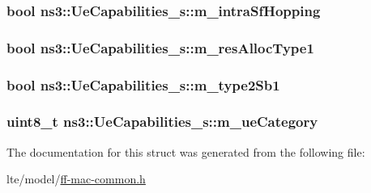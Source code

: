 \subsubsection[{\texorpdfstring{m\+\_\+intra\+Sf\+Hopping}{m_intraSfHopping}}]{\setlength{\rightskip}{0pt plus 5cm}bool ns3\+::\+Ue\+Capabilities\+\_\+s\+::m\+\_\+intra\+Sf\+Hopping}\hypertarget{structns3_1_1UeCapabilities__s_a1472edbb4f5fbbb415dedf557f324617}{}\label{structns3_1_1UeCapabilities__s_a1472edbb4f5fbbb415dedf557f324617}
\subsubsection[{\texorpdfstring{m\+\_\+res\+Alloc\+Type1}{m_resAllocType1}}]{\setlength{\rightskip}{0pt plus 5cm}bool ns3\+::\+Ue\+Capabilities\+\_\+s\+::m\+\_\+res\+Alloc\+Type1}\hypertarget{structns3_1_1UeCapabilities__s_a8e2976f85b05f3dd1959c99e2a173614}{}\label{structns3_1_1UeCapabilities__s_a8e2976f85b05f3dd1959c99e2a173614}
\subsubsection[{\texorpdfstring{m\+\_\+type2\+Sb1}{m_type2Sb1}}]{\setlength{\rightskip}{0pt plus 5cm}bool ns3\+::\+Ue\+Capabilities\+\_\+s\+::m\+\_\+type2\+Sb1}\hypertarget{structns3_1_1UeCapabilities__s_a01d57ac1baec239924ffe55ed94b1f06}{}\label{structns3_1_1UeCapabilities__s_a01d57ac1baec239924ffe55ed94b1f06}
\subsubsection[{\texorpdfstring{m\+\_\+ue\+Category}{m_ueCategory}}]{\setlength{\rightskip}{0pt plus 5cm}uint8\+\_\+t ns3\+::\+Ue\+Capabilities\+\_\+s\+::m\+\_\+ue\+Category}\hypertarget{structns3_1_1UeCapabilities__s_ac8e2c4367c705bea699a4c4d39acc3fb}{}\label{structns3_1_1UeCapabilities__s_ac8e2c4367c705bea699a4c4d39acc3fb}


The documentation for this struct was generated from the following file\+:\begin{DoxyCompactItemize}
\item 
lte/model/\hyperlink{ff-mac-common_8h}{ff-\/mac-\/common.\+h}\end{DoxyCompactItemize}
